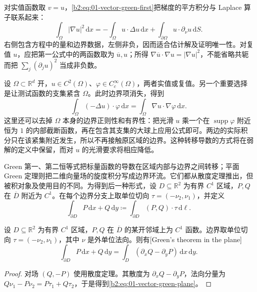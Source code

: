 对实值函数取 \(v=u\)，\eqref{b2:eq:01-vector-green-first}把梯度的平方积分与 Laplace 算子联系起来：
\[
 \int_\Omega|\nabla u|^2\,\mathrm dx
 =-\int_\Omega u\cdot\Delta u\,\mathrm dx
   +\int_{\partial\Omega}u\cdot\partial_\nu u\,\mathrm dS.
\]
右侧包含方程中的量和边界数据，左侧非负，因而适合估计解及证明唯一性。对复值 \(u\)，应把第一公式中的两函数取为 \(\overline u,u\)；所得 \(\nabla\overline u\cdot\nabla u=|\nabla u|^2\)，不能省略共轭而把 \(\sum_j(\partial_ju)^2\) 当成非负数。

\ProseParagraphBreak

设 \(\Omega\subset\mathbb R^d\) 开，\(u\in C^2(\Omega)\)、\(\varphi\in C_c^\infty(\Omega)\)，两者实值或复值。另一个重要选择是让测试函数的支集紧含 \(\Omega\)。此时边界项消失，得到
\[
 \int_\Omega(-\Delta u)\cdot\varphi\,\mathrm dx
 =\int_\Omega\nabla u\cdot\nabla\varphi\,\mathrm dx.
\]
这里还可以去掉 \(\Omega\) 本身的边界正则性和有界性：把光滑 \(u\) 乘一个在 \(\operatorname{supp}\varphi\) 附近恒为 \(1\) 的内部截断函数，再在包含其支集的大球上应用公式即可。两边的实际积分只在该紧集附近发生，所以不再接触原区域的边界。这种转移导数的方式将在弱解的定义中保留，而对 \(u\) 的光滑要求将相应降低。

\ProseParagraphBreak

Green 第一、第二恒等式把标量函数的导数在区域内部与边界之间转移；平面 Green 定理则把二维向量场的旋度积分写成边界环流。它们都从散度定理推出，但被积对象及使用目的不同。为得到后一种形式，设 \(D\subseteq\mathbb R^2\) 为有界 \(C^1\) 区域，\(P,Q\) 在 \(\overline D\) 附近为 \(C^1\)。在每个边界分支上取单位切向 \(\tau=(-\nu_2,\nu_1)\)，并定义
\[
 \int_{\partial D}P\,\mathrm dx+Q\,\mathrm dy
 \coloneqq\int_{\partial D}(P,Q)\cdot\tau\,\mathrm d\ell.
\]
\begin{theorem}[平面 Green 定理]\label{b2:thm:01-vector-green-plane}
设 \(D\subseteq\mathbb R^2\) 为有界 \(C^1\) 区域，\(P,Q\) 在 \(\overline D\) 的某开邻域上为 \(C^1\) 函数。边界取单位切向 \(\tau=(-\nu_2,\nu_1)\)，其中 \(\nu\) 是外单位法向。则有[Green's theorem in the plane]
\begin{equation}\label{b2:eq:01-vector-green-plane}
 \int_{\partial D}P\,\mathrm dx+Q\,\mathrm dy
 =\int_D(\partial_xQ-\partial_yP)\,\mathrm dx\,\mathrm dy.
\end{equation}
\end{theorem}
\begin{proof}
对场 \((Q,-P)\) 使用散度定理。其散度为 \(\partial_xQ-\partial_yP\)，法向分量为 \(Q\nu_1-P\nu_2=P\tau_1+Q\tau_2\)，于是得到\eqref{b2:eq:01-vector-green-plane}。
\end{proof}

